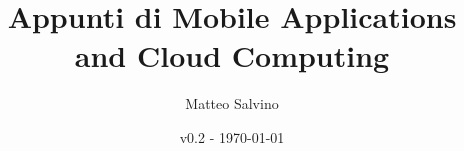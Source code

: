 \documentclass[12pt]{report}
\title{Appunti di Mobile Applications and Cloud Computing}
\author{Matteo Salvino}
\date{v0.2 - \today}
\begin{document}
\maketitle
\tableofcontents
\pagebreak








\begin{appendix}
    
\end{appendix}
\end{document}
